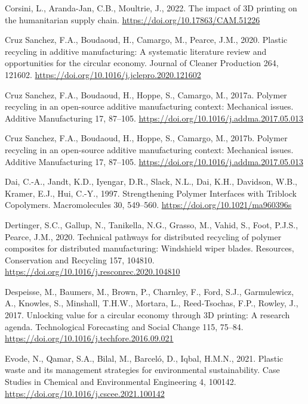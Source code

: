 \documentclass[
  12pt,
  number,
  review]{elsarticle}
\newlength{\cslhangindent}
\newlength{\cslentryspacingunit} %
\newenvironment{CSLReferences}[2] %
 {%
  \setlength{\parindent}{0pt}
  \ifodd #1
  \let\oldpar\par
  \def\par{\hangindent=\cslhangindent\oldpar}
  \fi
  \setlength{\parskip}{#2\cslentryspacingunit}
 }%
 {}
\begin{document}
\begin{CSLReferences}{1}{0}
\leavevmode{}%
Corsini, L., Aranda-Jan, C.B., Moultrie, J., 2022. The impact of {3D}
printing on the humanitarian supply chain.
\url{https://doi.org/10.17863/CAM.51226}

\leavevmode{}%
Cruz Sanchez, F.A., Boudaoud, H., Camargo, M., Pearce, J.M., 2020.
Plastic recycling in additive manufacturing: {A} systematic literature
review and opportunities for the circular economy. Journal of Cleaner
Production 264, 121602.
\url{https://doi.org/10.1016/j.jclepro.2020.121602}

\leavevmode{}%
Cruz Sanchez, F.A., Boudaoud, H., Hoppe, S., Camargo, M., 2017a. Polymer
recycling in an open-source additive manufacturing context: {Mechanical}
issues. Additive Manufacturing 17, 87--105.
\url{https://doi.org/10.1016/j.addma.2017.05.013}

\leavevmode{}%
Cruz Sanchez, F.A., Boudaoud, H., Hoppe, S., Camargo, M., 2017b. Polymer
recycling in an open-source additive manufacturing context: {Mechanical}
issues. Additive Manufacturing 17, 87--105.
\url{https://doi.org/10.1016/j.addma.2017.05.013}

\leavevmode{}%
Dai, C.-A., Jandt, K.D., Iyengar, D.R., Slack, N.L., Dai, K.H.,
Davidson, W.B., Kramer, E.J., Hui, C.-Y., 1997. Strengthening {Polymer
Interfaces} with {Triblock Copolymers}. Macromolecules 30, 549--560.
\url{https://doi.org/10.1021/ma960396s}

\leavevmode{}%
Dertinger, S.C., Gallup, N., Tanikella, N.G., Grasso, M., Vahid, S.,
Foot, P.J.S., Pearce, J.M., 2020. Technical pathways for distributed
recycling of polymer composites for distributed manufacturing:
{Windshield} wiper blades. Resources, Conservation and Recycling 157,
104810. \url{https://doi.org/10.1016/j.resconrec.2020.104810}

\leavevmode{}%
Despeisse, M., Baumers, M., Brown, P., Charnley, F., Ford, S.J.,
Garmulewicz, A., Knowles, S., Minshall, T.H.W., Mortara, L.,
Reed-Tsochas, F.P., Rowley, J., 2017. Unlocking value for a circular
economy through {3D} printing: {A} research agenda. Technological
Forecasting and Social Change 115, 75--84.
\url{https://doi.org/10.1016/j.techfore.2016.09.021}

\leavevmode{}%
Evode, N., Qamar, S.A., Bilal, M., Barceló, D., Iqbal, H.M.N., 2021.
Plastic waste and its management strategies for environmental
sustainability. Case Studies in Chemical and Environmental Engineering
4, 100142. \url{https://doi.org/10.1016/j.cscee.2021.100142}


\end{CSLReferences}
\end{document}
